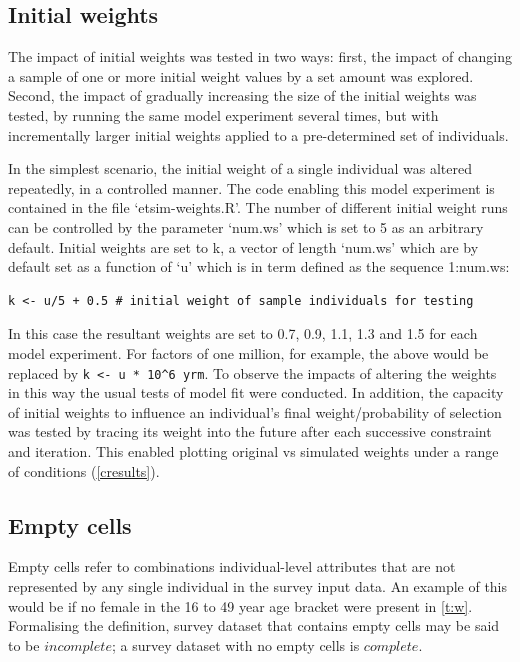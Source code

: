 \documentclass[a4paper,10pt]{article}
\begin{document}
\subsection{Initial weights}
The impact of initial weights was tested in two ways: first, the impact
 of changing a sample of one or more initial weight values by a set 
amount was explored. Second, the impact of gradually increasing the size of the initial 
weights was tested, by running the same model experiment several times, 
but with incrementally larger initial weights applied to a pre-determined set of individuals.

In the simplest scenario, the
initial weight of a single individual was altered 
repeatedly, in a controlled manner. The code enabling this model experiment 
is contained in the file `etsim-weights.R'. 
The number of different initial weight runs can be controlled by the 
parameter `num.ws' which is set to 5 as an arbitrary default.
Initial weights are set to k, a vector of length `num.ws' which
are by default set as a function of `u' which is in term
defined as the sequence 1:num.ws:

\begin{lstlisting}
k <- u/5 + 0.5 # initial weight of sample individuals for testing 
\end{lstlisting}

In this case the resultant weights are set to
 0.7, 0.9, 1.1, 1.3 and 1.5 for each model experiment. 
For factors of one million, for example, 
the above would be replaced by \lstinline !k <- u * 10^6 yrm!. 
To observe the impacts of altering the weights in this way
the usual tests of model fit were conducted. In addition,
the capacity of initial weights to influence an individual's 
final weight/probability of selection was tested by tracing its
weight into the future after each successive constraint and iteration. 
This enabled plotting original vs simulated weights under a 
range of conditions (\cref{cresults}).

\subsection{Empty cells} \label{smempty}
Empty cells refer to combinations individual-level 
attributes that are not represented by any single individual 
in the survey input data. An example of this would be if no female 
in the 16 to 49 year age bracket were present in \cref{t:w}.
Formalising the definition,
survey dataset that contains empty cells may be said to be $incomplete$;
a survey dataset with no empty cells is $complete$.
\end{document}
